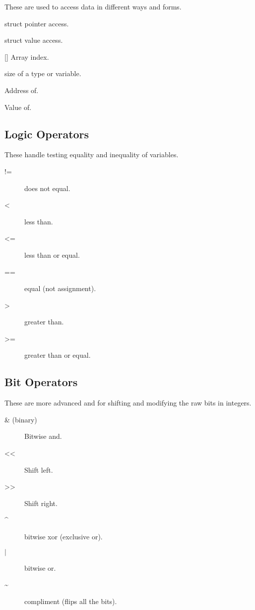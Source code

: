 These are used to access data in different ways and forms.

\begin{description}
\item[-\textgreater{}] struct pointer access.
\item[.] struct value access.
\item{[]} Array index.
\item[sizeof] size of a type or variable.
\item[\& (unary)] Address of.
\item[* (unary)] Value of.
\end{description}

\subsection{Logic Operators}

These handle testing equality and inequality of variables.

\begin{description}
\item[!=] does not equal.
\item[\textless{}] less than.
\item[\textless{}=] less than or equal.
\item[==] equal (not assignment).
\item[\textgreater{}] greater than.
\item[\textgreater{}=] greater than or equal.
\end{description}

\subsection{Bit Operators}

These are more advanced and for shifting and modifying the 
raw bits in integers.

\begin{description}
\item[\& (binary)] Bitwise and.
\item[\textless{}\textless{}] Shift left.
\item[\textgreater{}\textgreater{}] Shift right.
\item[\^{}] bitwise xor (exclusive or).
\item[$\vert$] bitwise or.
\item[\textasciitilde{}] compliment (flips all the bits).
\end{description}


